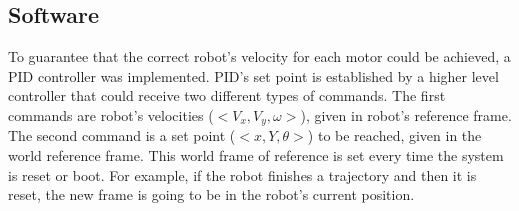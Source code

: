 \subsection{Software}
To guarantee that the correct robot's velocity for each motor could be achieved, a PID controller was implemented. PID's set point is established by a higher level controller that could receive two different types of commands. The first commands are robot's velocities ($<V_x,V_y,\omega>$), given in robot's reference frame. The second command is a set point ($<x, Y, \theta>$) to be reached, given in the world reference frame. This world frame of reference is set every time the system is reset or boot. For example, if the robot finishes a trajectory and then it is reset, the new frame is going to be in the robot's current position. 